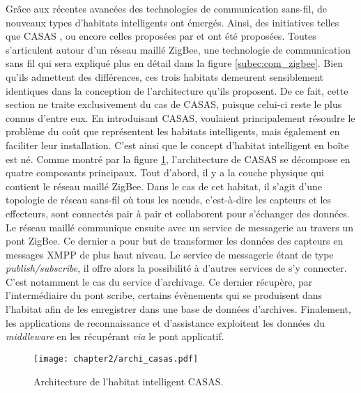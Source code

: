 Grâce aux récentes avancées des technologies de communication sans-fil, de nouveaux types d'habitats intelligents ont émergés. Ainsi, des initiatives telles que CASAS \citep{Cook2013}, ou encore celles proposées par \cite{Zhihua2016} et \cite{Zhenyu2011} ont été proposées. Toutes s'articulent autour d'un réseau maillé ZigBee, une technologie de communication sans fil qui sera expliqué plus en détail dans la figure \ref{subec:com_zigbee}. Bien qu'ils admettent des différences, ces trois habitats demeurent sensiblement identiques dans la conception de l'architecture qu'ils proposent. De ce fait, cette section ne traite exclusivement du cas de CASAS, puisque celui-ci reste le plus connus d'entre eux. En introduisant CASAS, \cite{Cook2013} voulaient principalement résoudre le problème du coût que représentent les habitats intelligents, mais également en faciliter leur installation. C'est ainsi que le concept d'habitat intelligent en boîte est né. Comme montré par la figure \ref{fig:archi_casas}, l'architecture de CASAS se décompose en quatre composants principaux. Tout d'abord, il y a la couche physique qui contient le réseau maillé ZigBee. Dans le cas de cet habitat, il s'agit d'une topologie de réseau sans-fil où tous les n\oe{}uds, c'est-à-dire les capteurs et les effecteurs, sont connectés pair à pair et collaborent pour s'échanger des données. Le réseau maillé communique ensuite avec un service de messagerie au travers un pont ZigBee. Ce dernier a pour but de transformer les données des capteurs en messages \ac{XMPP} de plus haut niveau. Le service de messagerie étant de type \textit{publish/subscribe}, il offre alors la possibilité à d'autres services de s'y connecter. C'est notamment le cas du service d'archivage. Ce dernier récupère, par l'intermédiaire du pont scribe, certains évènements qui se produisent dans l'habitat afin de les enregistrer dans une base de données d'archives. Finalement, les applications de reconnaissance et d'assistance exploitent les données du \textit{middleware} en les récupérant \textit{via} le pont applicatif.

\begin{figure}[H]
	\centering
	\texttt{[image: chapter2/archi\_casas.pdf]}
	\caption{Architecture de l'habitat intelligent CASAS.}
	\label{fig:archi_casas}
\end{figure}

